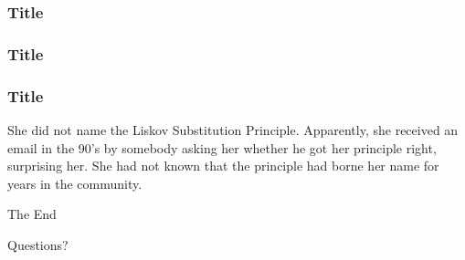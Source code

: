 \documentclass{beamer}
\begin{document}

\begin{frame}
\frametitle{Title}
\end{frame}



\begin{frame}
\frametitle{Title}
\end{frame}


\begin{frame}
\frametitle{Title}
She did not name the Liskov Substitution Principle. Apparently, she received an email in the 90’s by somebody asking her whether he got her principle right, surprising her. She had not known that the principle had borne her name for years in the community.
\end{frame}


\begin{frame}
\Huge{\centerline{The End}}
\end{frame}


\begin{frame}
\Huge{\centerline{Questions?}}
\end{frame}

\end{document}
